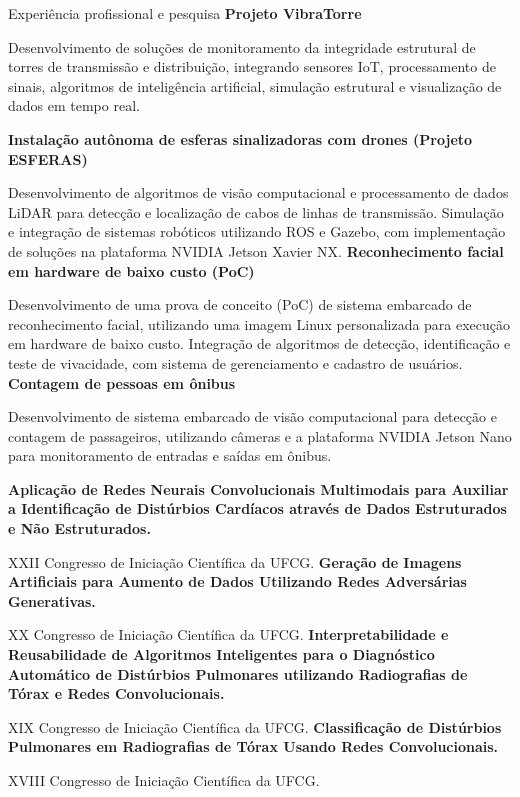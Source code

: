 \begin{rubric}{Experiência profissional e pesquisa}
\entry*[2024 -- 2026]%
  \textbf{Projeto VibraTorre} 
  \par Desenvolvimento de soluções de monitoramento da integridade estrutural de torres de transmissão e distribuição, integrando sensores IoT, processamento de sinais, algoritmos de inteligência artificial, simulação estrutural e visualização de dados em tempo real.
  \cvdivider

\entry*[2023 -- 2024]%
  \textbf{Instalação autônoma de esferas sinalizadoras com drones (Projeto ESFERAS)} 
  \par Desenvolvimento de algoritmos de visão computacional e processamento de dados LiDAR para detecção e localização de cabos de linhas de transmissão. Simulação e integração de sistemas robóticos utilizando ROS e Gazebo, com implementação de soluções na plataforma NVIDIA Jetson Xavier NX.
\entry*[2024]%
  \textbf{Reconhecimento facial em hardware de baixo custo (PoC)} 
  \par Desenvolvimento de uma prova de conceito (PoC) de sistema embarcado de reconhecimento facial, utilizando uma imagem Linux personalizada para execução em hardware de baixo custo. Integração de algoritmos de detecção, identificação e teste de vivacidade, com sistema de gerenciamento e cadastro de usuários.
\entry*[2023]%
  \textbf{Contagem de pessoas em ônibus} 
  \par Desenvolvimento de sistema embarcado de visão computacional para detecção e contagem de passageiros, utilizando câmeras e a plataforma NVIDIA Jetson Nano para monitoramento de entradas e saídas em ônibus.
  \cvdivider

\entry*[2024 -- 2025]%
  \textbf{Aplicação de Redes Neurais Convolucionais Multimodais para Auxiliar a Identificação de Distúrbios Cardíacos através de Dados Estruturados e Não Estruturados.} 
  \par XXII Congresso de Iniciação Científica da UFCG.
\entry*[2022 -- 2023]%
  \textbf{Geração de Imagens Artificiais para Aumento de Dados Utilizando Redes Adversárias Generativas.} 
  \par XX Congresso de Iniciação Científica da UFCG.
\entry*[2021 -- 2022]%
  \textbf{Interpretabilidade e Reusabilidade de Algoritmos Inteligentes para o Diagnóstico Automático de Distúrbios Pulmonares utilizando Radiografias de Tórax e Redes Convolucionais.} 
  \par XIX Congresso de Iniciação Científica da UFCG.
\entry*[2020 -- 2021]%
  \textbf{Classificação de Distúrbios Pulmonares em Radiografias de Tórax Usando Redes Convolucionais.} 
  \par XVIII Congresso de Iniciação Científica da UFCG.
\end{rubric}

